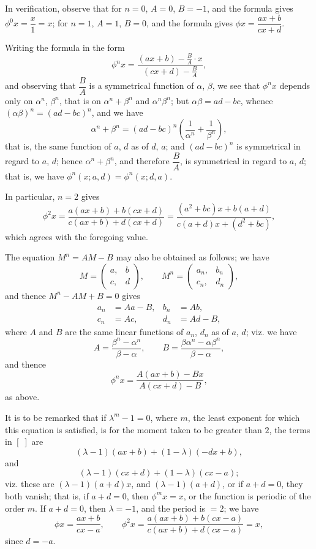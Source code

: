 \documentclass[11pt,a4paper]{book}
\begin{document}
In verification, observe that for $n=0$, $A=0$, $B=-1$, and the formula gives
$\phi^0 x = \dfrac{x}{1} = x$; for $n=1$, $A=1$, $B=0$, and the formula gives
$\phi x = \dfrac{ax+b}{cx+d}$.

Writing the formula in the form
%
\[
\phi^n x = \frac{(ax+b) - \frac{B}{A} \cdot x}{(cx+d) - \frac{B}{A}},
\]
%
and observing that $\dfrac{B}{A}$ is a symmetrical function of $\alpha$, $\beta$, we see that
$\phi^n x$ depends only on $\alpha^n$, $\beta^n$, that is on $\alpha^n + \beta^n$ and $\alpha^n \beta^n$;
but $\alpha\beta = ad-bc$, whence $(\alpha\beta)^n = (ad-bc)^n$, and we have
%
\[
\alpha^n + \beta^n = (ad-bc)^n \left(\frac{1}{\alpha^n} + \frac{1}{\beta^n}\right),
\]
%
that is, the same function of $a$, $d$ as of $d$, $a$; and $(ad-bc)^n$ is symmetrical
in regard to $a$, $d$; hence $\alpha^n + \beta^n$, and therefore $\dfrac{B}{A}$, is symmetrical in
regard to $a$, $d$; that is, we have $\phi^n(x;a,d) = \phi^n(x;d,a)$.

In particular, $n=2$ gives
%
\[
\phi^2 x = \frac{a(ax+b) + b(cx+d)}{c(ax+b) + d(cx+d)}
= \frac{(a^2+bc)x + b(a+d)}{c(a+d)x + (d^2+bc)},
\]
%
which agrees with the foregoing value.

The equation $M^n = AM - B$ may also be obtained as follows; we have
%
\[
M = \left(\begin{array}{c|c} a, & b \\ \hline c, & d \end{array}\right),
\qquad
M^n = \left(\begin{array}{c|c} a_n, & b_n \\ \hline c_n, & d_n \end{array}\right),
\]
%
and thence $M^n - AM + B = 0$ gives
\begin{align*}
a_n &= Aa - B, & b_n &= Ab, \\
c_n &= Ac, & d_n &= Ad - B,
\end{align*}
%
where $A$ and $B$ are the same linear functions of $a_n$, $d_n$ as of $a$, $d$;
viz. we have
%
\[
A = \frac{\beta^n - \alpha^n}{\beta - \alpha}, \qquad
B = \frac{\beta\alpha^n - \alpha\beta^n}{\beta - \alpha},
\]
%
and thence
%
\[
\phi^n x = \frac{A(ax+b) - Bx}{A(cx+d) - B},
\]
%
as above.

It is to be remarked that if $\lambda^m - 1 = 0$, where $m$, the least exponent for
which this equation is satisfied, is for the moment taken to be greater than $2$,
the terms in $[\;]$ are
%
\[
(\lambda-1)(ax+b) + (1-\lambda)(-dx+b),
\]
and
%
\[
(\lambda-1)(cx+d) + (1-\lambda)(cx-a);
\]
viz. these are $(\lambda-1)(a+d)x$, and $(\lambda-1)(a+d)$, or if $a+d = 0$, they
both vanish; that is, if $a+d = 0$, then $\phi^m x = x$, or the function is periodic
of the order $m$. If $a+d = 0$, then $\lambda = -1$, and the period is $=2$; we have
%
\[
\phi x = \frac{ax+b}{cx-a},
\qquad
\phi^2 x = \frac{a(ax+b) + b(cx-a)}{c(ax+b) + d(cx-a)} = x,
\]
%
since $d = -a$.
\end{document}
